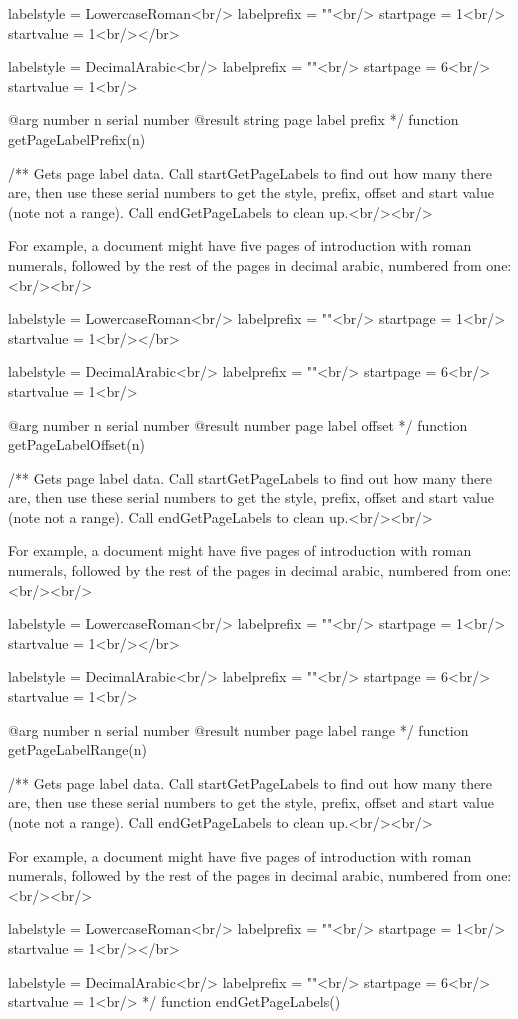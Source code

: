 labelstyle = LowercaseRoman<br/>
labelprefix = ""<br/>
startpage = 1<br/>
startvalue = 1<br/></br>

labelstyle = DecimalArabic<br/>
labelprefix = ""<br/>
startpage = 6<br/>
startvalue = 1<br/>

@arg {number} n serial number
@result {string} page label prefix */
function getPageLabelPrefix(n) {}

/** Gets page label data. Call startGetPageLabels to find out how many
there are, then use these serial numbers to get the style, prefix, offset
and start value (note not a range). Call endGetPageLabels to clean up.<br/><br/>

For example, a document might have five pages of introduction with roman
numerals, followed by the rest of the pages in decimal arabic, numbered from
one:<br/><br/>

labelstyle = LowercaseRoman<br/>
labelprefix = ""<br/>
startpage = 1<br/>
startvalue = 1<br/></br>

labelstyle = DecimalArabic<br/>
labelprefix = ""<br/>
startpage = 6<br/>
startvalue = 1<br/>

@arg {number} n serial number
@result {number} page label offset */
function getPageLabelOffset(n) {}

/** Gets page label data. Call startGetPageLabels to find out how many
there are, then use these serial numbers to get the style, prefix, offset
and start value (note not a range). Call endGetPageLabels to clean up.<br/><br/>

For example, a document might have five pages of introduction with roman
numerals, followed by the rest of the pages in decimal arabic, numbered from
one:<br/><br/>

labelstyle = LowercaseRoman<br/>
labelprefix = ""<br/>
startpage = 1<br/>
startvalue = 1<br/></br>

labelstyle = DecimalArabic<br/>
labelprefix = ""<br/>
startpage = 6<br/>
startvalue = 1<br/>

@arg {number} n serial number
@result {number} page label range */
function getPageLabelRange(n) {}

/** Gets page label data. Call startGetPageLabels to find out how many
there are, then use these serial numbers to get the style, prefix, offset
and start value (note not a range). Call endGetPageLabels to clean up.<br/><br/>

For example, a document might have five pages of introduction with roman
numerals, followed by the rest of the pages in decimal arabic, numbered from
one:<br/><br/>

labelstyle = LowercaseRoman<br/>
labelprefix = ""<br/>
startpage = 1<br/>
startvalue = 1<br/></br>

labelstyle = DecimalArabic<br/>
labelprefix = ""<br/>
startpage = 6<br/>
startvalue = 1<br/> */
function endGetPageLabels() {}


